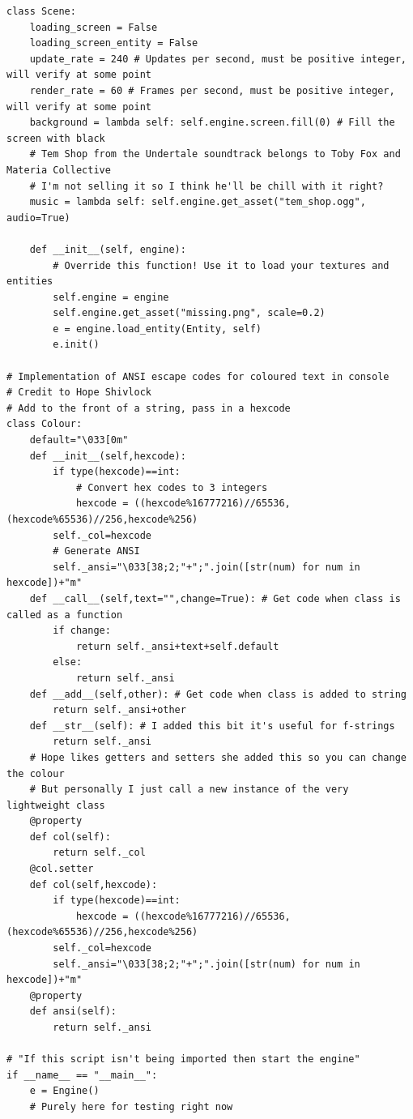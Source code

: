 \documentclass{report}
\begin{document}
\begin{verbatim}
class Scene:
    loading_screen = False
    loading_screen_entity = False
    update_rate = 240 # Updates per second, must be positive integer, will verify at some point
    render_rate = 60 # Frames per second, must be positive integer, will verify at some point
    background = lambda self: self.engine.screen.fill(0) # Fill the screen with black
    # Tem Shop from the Undertale soundtrack belongs to Toby Fox and Materia Collective
    # I'm not selling it so I think he'll be chill with it right?
    music = lambda self: self.engine.get_asset("tem_shop.ogg", audio=True)
    
    def __init__(self, engine):
        # Override this function! Use it to load your textures and entities
        self.engine = engine
        self.engine.get_asset("missing.png", scale=0.2)
        e = engine.load_entity(Entity, self)
        e.init()

# Implementation of ANSI escape codes for coloured text in console
# Credit to Hope Shivlock
# Add to the front of a string, pass in a hexcode
class Colour:
    default="\033[0m"
    def __init__(self,hexcode):
        if type(hexcode)==int:
            # Convert hex codes to 3 integers
            hexcode = ((hexcode%16777216)//65536,(hexcode%65536)//256,hexcode%256)
        self._col=hexcode
        # Generate ANSI
        self._ansi="\033[38;2;"+";".join([str(num) for num in hexcode])+"m"
    def __call__(self,text="",change=True): # Get code when class is called as a function
        if change:
            return self._ansi+text+self.default
        else:
            return self._ansi
    def __add__(self,other): # Get code when class is added to string
        return self._ansi+other
    def __str__(self): # I added this bit it's useful for f-strings
        return self._ansi
    # Hope likes getters and setters she added this so you can change the colour
    # But personally I just call a new instance of the very lightweight class
    @property
    def col(self):
        return self._col
    @col.setter
    def col(self,hexcode):
        if type(hexcode)==int:
            hexcode = ((hexcode%16777216)//65536,(hexcode%65536)//256,hexcode%256)
        self._col=hexcode
        self._ansi="\033[38;2;"+";".join([str(num) for num in hexcode])+"m"
    @property
    def ansi(self):
        return self._ansi

# "If this script isn't being imported then start the engine"
if __name__ == "__main__":
    e = Engine()
    # Purely here for testing right now
    
\end{verbatim}
\end{document}
